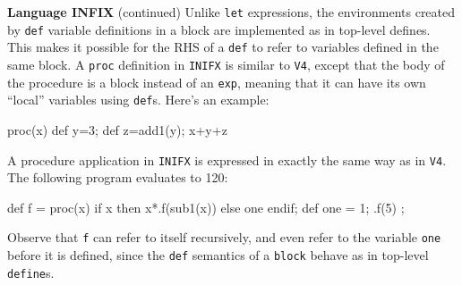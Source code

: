 \begin{minipage}[t]{\sw}
\slidenumber
\LARGE
{\bf Language INFIX} (continued)\exx
Unlike \verb'let' expressions,
the environments created by \verb'def' variable definitions in a block
are implemented as in top-level defines.
This makes it possible for the RHS of a \verb'def'
to refer to variables defined in the same block.\exx
A \verb'proc' definition in \verb'INIFX' is similar to \verb'V4',
except that the body of the procedure is a block instead of an \verb'exp',
meaning that it can have its own ``local'' variables using \verb'def's.
Here's an example:
\begin{qv}
proc(x) {def y=3; def z=add1(y); x+y+z}
\end{qv}
A procedure application in \verb'INIFX' is expressed
in exactly the same way as in \verb'V4'.
The following program evaluates to 120:
\begin{qv}
{
  def f = 
    proc(x) {if x then x*.f(sub1(x)) else one endif};
  def one = 1;
  .f(5)
} ;
\end{qv}
Observe that \verb'f' can refer to itself recursively,
and even refer to the variable \verb'one' before it is defined,
since the \verb'def' semantics of a \verb'block'
behave as in top-level \verb'define's.
\end{minipage}
